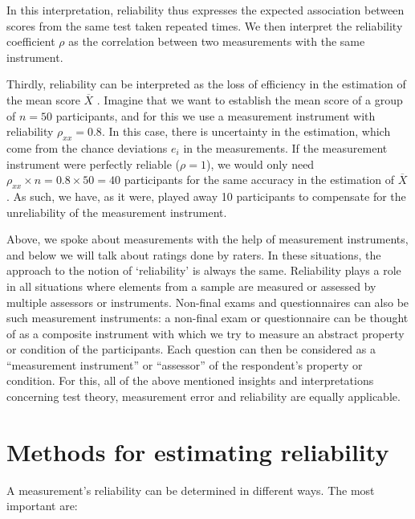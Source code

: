\documentclass[
]{book}
\begin{document}
In this interpretation, reliability thus expresses the expected association
between scores from the same test taken repeated times. We then interpret the reliability
coefficient \(\rho\) as the correlation between two measurements
with the same instrument.

Thirdly, reliability can be interpreted as the loss
of efficiency in the estimation of the mean score \(\overline{X}\)
\citep[ p.474]{Ferg89}. Imagine that we want to establish the mean score of a group of
\(n=50\) participants, and for this we use a measurement instrument
with reliability \(\rho_{xx}=0.8\). In this case, there is uncertainty in the estimation,
which come from the chance deviations \(e_i\) in the measurements.
If the measurement instrument were perfectly reliable (\(\rho=1\)), we would only
need \(\rho_{xx}\times n = 0.8\times50=40\) participants for the same accuracy in
the estimation of \(\overline{X}\)
\citep[ p.474]{Ferg89}. As such, we have, as it were, played away 10 participants
to compensate for the unreliability of the measurement instrument.

Above, we spoke about measurements with the help of measurement instruments,
and below we will talk about ratings done
by raters. In these situations, the approach to the notion of `reliability'
is always the same. Reliability plays a role in all situations where
elements from a sample are measured or assessed by multiple assessors or instruments.
Non-final exams and questionnaires can also be such measurement instruments: a non-final
exam or questionnaire can be thought of as a composite instrument
with which we try to measure an abstract property or condition of the participants.
Each question can then be considered as a
``measurement instrument'' or ``assessor'' of the respondent's property or condition.
For this, all of the above mentioned insights and interpretations concerning
test theory, measurement error and reliability are equally applicable.

\hypertarget{methods-for-estimating-reliability}{%
\section{Methods for estimating reliability}\label{methods-for-estimating-reliability}}

A measurement's reliability can be determined in different ways.
The most important are:
\end{document}
